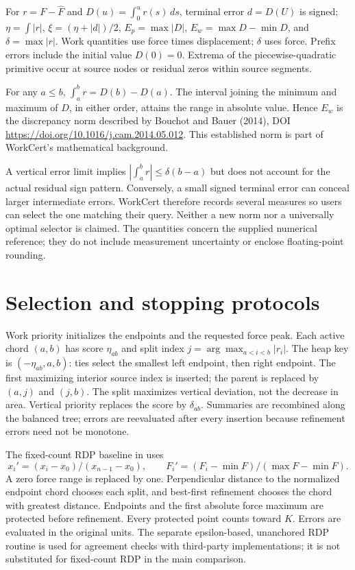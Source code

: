 \documentclass[11pt,a4paper]{article}
\begin{document}
For $r=F-\widehat F$ and $D(u)=\int_0^u r(s)\,ds$, terminal error $d=D(U)$ is signed; $\eta=\int|r|$, $\xi=(\eta+|d|)/2$, $E_p=\max|D|$, $E_w=\max D-\min D$, and $\delta=\max|r|$. Work quantities use force times displacement; $\delta$ uses force. Prefix errors include the initial value $D(0)=0$. Extrema of the piecewise-quadratic primitive occur at source nodes or residual zeros within source segments.

For any $a\leq b$, $\int_a^b r=D(b)-D(a)$. The interval joining the minimum and maximum of $D$, in either order, attains the range in absolute value. Hence $E_w$ is the discrepancy norm described by Bouchot and Bauer (2014), DOI \url{https://doi.org/10.1016/j.cam.2014.05.012}. This established norm is part of WorkCert's mathematical background.

A vertical error limit implies $|\int_a^b r|\leq\delta(b-a)$ but does not account for the actual residual sign pattern. Conversely, a small signed terminal error can conceal larger intermediate errors. WorkCert therefore records several measures so users can select the one matching their query. Neither a new norm nor a universally optimal selector is claimed. The quantities concern the supplied numerical reference; they do not include measurement uncertainty or enclose floating-point rounding.

\section{Selection and stopping protocols}
Work priority initializes the endpoints and the requested force peak. Each active chord $(a,b)$ has score $\eta_{ab}$ and split index $j=\arg\max_{a<i<b}|r_i|$. The heap key is $(-\eta_{ab},a,b)$: ties select the smallest left endpoint, then right endpoint. The first maximizing interior source index is inserted; the parent is replaced by $(a,j)$ and $(j,b)$. The split maximizes vertical deviation, not the decrease in area. Vertical priority replaces the score by $\delta_{ab}$. Summaries are recombined along the balanced tree; errors are reevaluated after every insertion because refinement errors need not be monotone.

The fixed-count RDP baseline in  uses
\[
x_i'=(x_i-x_0)/(x_{n-1}-x_0),\qquad
F_i'=(F_i-\min F)/(\max F-\min F).
\]
A zero force range is replaced by one. Perpendicular distance to the normalized endpoint chord chooses each split, and best-first refinement chooses the chord with greatest distance. Endpoints and the first absolute force maximum are protected before refinement. Every protected point counts toward $K$. Errors are evaluated in the original units. The separate epsilon-based, unanchored RDP routine is used for agreement checks with third-party implementations; it is not substituted for fixed-count RDP in the main comparison.
\end{document}
